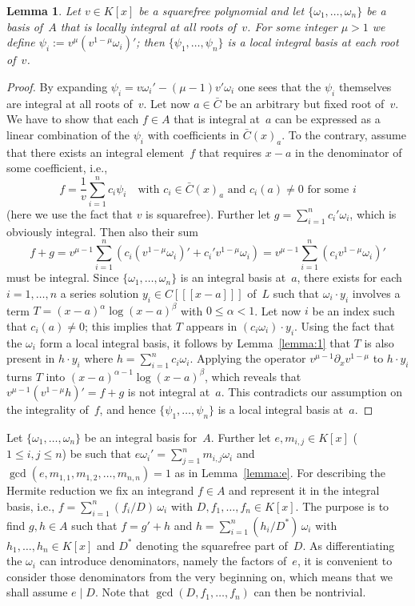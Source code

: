 \documentclass[final,1p,times,authoryear]{elsarticle}
\newtheorem{lemma}[theorem]{Lemma}
\begin{document}
\begin{lemma}\label{lemma:ibv}
Let $v\in K[x]$ be a squarefree polynomial and let $\{\omega_1,\ldots,\omega_n\}$
be a basis of~$A$ that is locally integral at all roots of~$v$.
For some integer $\mu>1$ we define $\psi_i:=v^\mu\left(v^{1-\mu}\omega_i\right)'$; then
$\{\psi_1,\ldots,\psi_n\}$ is a local integral basis at each root of~$v$.
\end{lemma}
\begin{proof}
By expanding $\psi_i=v\omega_i'-(\mu-1)v'\omega_i$ one sees that the $\psi_i$
themselves are integral at all roots of~$v$. Let now $a\in\bar{C}$ be an
arbitrary but fixed root of~$v$. We have to show that each $f\in A$ that is
integral at~$a$ can be expressed as a linear combination of the $\psi_i$ with
coefficients in $\bar C(x)_a$. To the contrary, assume that there exists an
integral element~$f$ that requires $x-a$ in the denominator of some
coefficient, i.e.,
\[
  f = \frac{1}{v} \sum_{i=1}^n c_i \psi_i \quad\text{with }c_i\in \bar{C}(x)_a
  \text{ and } c_i(a)\neq0 \text{ for some } i
\]
(here we use the fact that $v$ is squarefree).  Further let $g=\sum_{i=1}^n
c_i'\omega_i$, which is obviously integral. Then also their sum
\[
  f+g = v^{\mu-1} \sum_{i=1}^n \left(c_i\left(v^{1-\mu}\omega_i\right)'
  + c_i'v^{1-\mu}\omega_i \right) 
  = v^{\mu-1} \sum_{i=1}^n \left(c_iv^{1-\mu}\omega_i\right)'
\]
must be integral. Since $\{\omega_1,\ldots,\omega_n\}$ is an integral basis at~$a$,
there exists for each $i=1,\ldots,n$ a series solution $y_i\in C[[[x-a]]]$
of~$L$ such that $\omega_i\cdot y_i$ involves a term
$T=(x-a)^\alpha\log(x-a)^\beta$ with $0\leq\alpha<1$.
Let now $i$ be an index such that $c_i(a)\neq0$;
this implies that $T$ appears in $(c_i\omega_i)\cdot y_i$.
Using the fact that the $\omega_i$ form a local integral basis, it follows by
Lemma~\ref{lemma:1} that $T$ is also present in $h\cdot y_i$ where
$h=\sum_{i=1}^n c_i\omega_i$. Applying the operator $v^{\mu-1}\partial_xv^{1-\mu}$
to $h\cdot y_i$ turns $T$ into $(x-a)^{\alpha-1}\log(x-a)^\beta$, which reveals that
$v^{\mu-1}(v^{1-\mu}h)'=f+g$ is not integral at~$a$. This contradicts our assumption on
the integrality of~$f$, and hence $\{\psi_1,\ldots,\psi_n\}$ is a local integral
basis at~$a$.
\end{proof}

Let $\{\omega_1,\ldots,\omega_n\}$ be an integral basis for~$A$.
Further let $e,m_{i,j}\in K[x]$ ($1\leq i,j\leq n$) be such that
$e\omega_i'=\sum_{j=1}^n m_{i,j}\omega_i$ and
$\gcd(e,m_{1,1},m_{1,2},\ldots,m_{n,n})=1$ as in Lemma~\ref{lemma:e}. For describing
the Hermite reduction we fix an integrand $f\in A$ and represent it in the
integral basis, i.e., $f=\sum_{i=1}^n (f_i/D)\,\omega_i$ with
$D,f_1,\ldots,f_n\in K[x]$. The purpose is to find $g,h\in A$ such that
$f=g'+h$ and $h=\sum_{i=1}^n(h_i/D^\ast)\,\omega_i$ with $h_1,\ldots,h_n\in K[x]$
and $D^\ast$ denoting the squarefree part of~$D$.
As differentiating the $\omega_i$ can introduce
denominators, name\-ly the factors of~$e$, it is convenient to consider those
denominators from the very beginning on, which means that we shall assume
$e\mid D$. Note that $\gcd(D,f_1,\ldots,f_n)$ can then be nontrivial.
\end{document}
